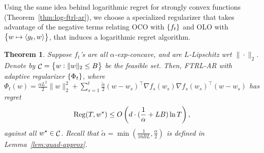 \documentclass{article}
\newtheorem{theorem}{Theorem}
\DeclareMathOperator*{\Reg}{{\rm Reg}}
\DeclareMathOperator*{\Ccal}{{\cal C}}
\newcommand{\inner}[2]{\left\langle #1,#2 \right\rangle}
\begin{document}
Using the same idea behind logarithmic regret for strongly convex functions (Theorem~\ref{thm:log-ftrl-ar}), we choose a specialized regularizer that takes advantage of the negative terms relating OCO with $\cbr{f_t}$ and OLO with $\cbr{w \mapsto \inner{g_t}{w}}$, that induces a logarithmic regret algorithm.

\begin{theorem}
Suppose $f_t$'s are all $\alpha$-exp-concave, and are $L$-Lipschitz wrt $\| \cdot \|_2$.
Denote by $\Ccal = \cbr{w: \| w \|_2 \leq B}$ be the feasible set.
Then,
FTRL-AR with adaptive regularizer $\cbr{\Phi_t}$, where $\Phi_t(w) = \frac{\alpha L^2}2 \| w \|_2^2 + \sum_{s=1}^t \frac{\tilde{\alpha}}{2}(w - w_s)^\top \nabla f_s(w_s) \nabla f_s(w_s)^\top (w - w_s)$ has regret
\[ \Reg(T, w^\star) \leq O\del{d \cdot (\frac{1}{\alpha} + LB) \ln T}, \]
against all $w^\star \in \Ccal$. Recall that $\tilde{\alpha} = \min(\frac{1}{16BL}, \frac\alpha2)$ is defined in Lemma~\ref{lem:quad-approx}.
\end{theorem}
\end{document}
